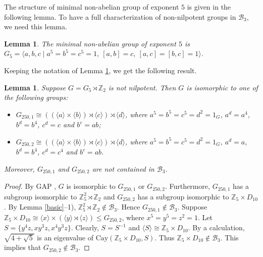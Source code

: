 \documentclass[12pt,a4paper]{article}
\newtheorem{lem}[thm]{Lemma}
\def \leq {\leqslant}
\begin{document}
	The structure of minimal non-abelian group of exponent $5$ is given in the following lemma. To have a full characterization of non-nilpotent groups in $\mathcal{B}_3$, we need this lemma.
	\begin{lem}\cite{Redei}\label{lem:G5}
		The minimal non-abelian group of exponent $5$ is $G_5=\langle a,b,c\mid a^5=b^5=c^5=1,~[a,b]=c,~[a,c]=[b,c]=1\rangle$.
	\end{lem}
	 Keeping the notation of Lemma \ref{lem:G5}, we get the following result.
	\begin{lem}\label{lem:G5Z2}
		Suppose	$G=G_5\rtimes \mathbb{Z}_2$ is not nilpotent.
		Then $G$ is isomorphic to one of the following groups:
		\begin{itemize}
			\item[$1)$] $G_{250,1}\cong ((\langle a\rangle \times \langle b\rangle)\rtimes \langle c\rangle)\rtimes \langle d\rangle$, where $a^5=b^5=c^5=d^2=1_G$, $a^d=a^4$, $b^d=b^4$, $c^d=c$ and $b^c=ab$;
			\item[$2)$] $G_{250,2}\cong ((\langle a\rangle \times \langle b\rangle)\rtimes \langle c\rangle)\rtimes \langle d\rangle$, where $a^5=b^5=c^5=d^2=1_G$, $a^d=a$, $b^d=b^4$, $c^d=c^4$ and $b^c=ab$.
		\end{itemize}
		Moreover, $G_{250,1}$ and $G_{250,2}$ are not contained in $\mathcal{B}_3$.
	\end{lem}
	\begin{proof}
		By GAP \cite{GAP}, $G$ is isomorphic to $G_{250,1}$ or $G_{250,2}$. Furthermore, $G_{250,1}$ has a subgroup isomorphic to $\mathbb{Z}_5^2\rtimes \mathbb{Z}_2$ and $G_{250,2}$ has a subgroup isomorphic to $\mathbb{Z}_5\times D_{10}$.
		By Lemma \ref{basic}--1), $\mathbb{Z}_5^2\rtimes \mathbb{Z}_2\notin \mathcal{B}_3$.
		Hence $G_{250,1}\notin \mathcal{B}_3$.
		Suppose $\mathbb{Z}_5\times D_{10}\cong \langle x\rangle\times(\langle y\rangle\rtimes \langle z\rangle)\leq G_{250,2}$, where $x^5=y^5=z^2=1$.
		Let $S=\{y^4z,xy^3z,x^4y^3z\}$.
		Clearly, $S=S^{-1}$ and $\langle S\rangle\cong \mathbb{Z}_5\times D_{10}$.
		By a calculation, $\sqrt{4+\sqrt{5}}$ is an eigenvalue of $\mathrm{Cay}(\mathbb{Z}_5\times D_{10},S)$.
		Thus $\mathbb{Z}_5\times D_{10}\notin \mathcal{B}_3$.
		This implies that $G_{250,2}\notin \mathcal{B}_3$.
	\end{proof}
	 
\end{document}

